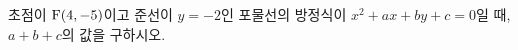 초점이 $\mathrm{F}(4{,}\mkern3mu\mathopen{}-5)$이고 준선이 $y=-2$인 포물선의 방정식이 $x^2+ax+by+c=0$일 때, $a+b+c$의 값을 구하시오. 
